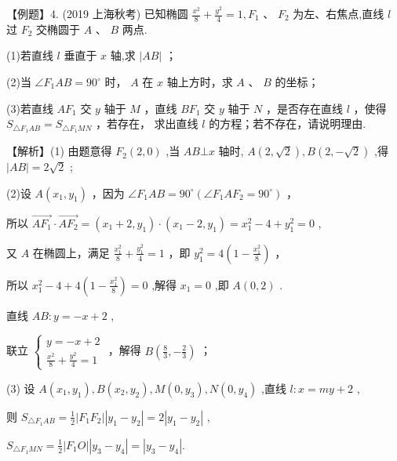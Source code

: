 \documentclass[10pt]{article}
\begin{document}
【例题】4. (2019 上海秋考) 已知椭圆 \(\frac{{x}^{2}}{8} + \frac{{y}^{2}}{4} = 1,{F}_{1}\text{ 、 }{F}_{2}\) 为左、右焦点,直线 \(l\) 过 \({F}_{2}\) 交椭圆于 \(A\text{ 、 }B\) 两点.

(1)若直线 \(l\) 垂直于 \(x\) 轴,求 \(\left| {AB}\right|\) ；

(2)当 \(\angle {F}_{1}{AB} = {90}^{ \circ  }\) 时， \(A\) 在 \(x\) 轴上方时，求 \(A\) 、 \(B\) 的坐标；

(3)若直线 \(A{F}_{1}\) 交 \(y\) 轴于 \(M\) ，直线 \(B{F}_{1}\) 交 \(y\) 轴于 \(N\) ，是否存在直线 \(l\) ，使得 \({S}_{\bigtriangleup {F}_{1}{AB}} = {S}_{\bigtriangleup {F}_{1}{MN}}\) ，若存在， 求出直线 \(l\) 的方程；若不存在，请说明理由.

【解析】(1) 由题意得 \({F}_{2}\left( {2,0}\right)\) ,当 \({AB} \bot  x\) 轴时, \(A\left( {2,\sqrt{2}}\right) ,B\left( {2, - \sqrt{2}}\right)\) ,得 \(\left| {AB}\right|  = 2\sqrt{2}\) ;

(2)设 \(A\left( {{x}_{1},{y}_{1}}\right)\) ，因为 \(\angle {F}_{1}{AB} = {90}^{ \circ  }\left( {\angle {F}_{1}{A{F}_{2}} = {90}^{ \circ  }}\right)\) ，

所以 \(\overrightarrow{A{F}_{1}} \cdot  \overrightarrow{A{F}_{2}} = \left( {{x}_{1} + 2,{y}_{1}}\right)  \cdot  \left( {{x}_{1} - 2,{y}_{1}}\right)  = {x}_{1}^{2} - 4 + {y}_{1}^{2} = 0\) ,

又 \(A\) 在椭圆上，满足 \(\frac{{x}_{1}^{2}}{8} + \frac{{y}_{1}^{2}}{4} = 1\) ，即 \({y}_{1}^{2} = 4\left( {1 - \frac{{x}_{1}^{2}}{8}}\right)\) ，

所以 \({x}_{1}^{2} - 4 + 4\left( {1 - \frac{{x}_{1}^{2}}{8}}\right)  = 0\) ,解得 \({x}_{1} = 0\) ,即 \(A\left( {0,2}\right)\) .

直线 \({AB} : y =  - x + 2\) ,

联立 \(\left\{  \begin{array}{l} y =  - x + 2 \\  \frac{{x}^{2}}{8} + \frac{{y}^{2}}{4} = 1 \end{array}\right.\) ，解得 \(B\left( {\frac{8}{3}, - \frac{2}{3}}\right)\) ；

(3) 设 \(A\left( {{x}_{1},{y}_{1}}\right) ,B\left( {{x}_{2},{y}_{2}}\right) ,M\left( {0,{y}_{3}}\right) ,N\left( {0,{y}_{4}}\right)\) ,直线 \(l : x = {my} + 2\) ,

则 \({S}_{\bigtriangleup {F}_{1}{AB}} = \frac{1}{2}\left| {{F}_{1}{F}_{2}}\right| \left| {{y}_{1} - {y}_{2}}\right|  = 2\left| {{y}_{1} - {y}_{2}}\right|\) ,

\({S}_{\bigtriangleup {F}_{1}{MN}} = \frac{1}{2}\left| {{F}_{1}O}\right| \left| {{y}_{3} - {y}_{4}}\right|  = \left| {{y}_{3} - {y}_{4}}\right| .\)
\end{document}

